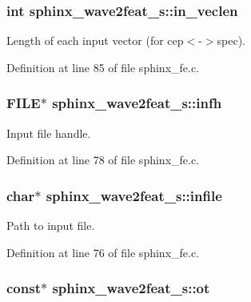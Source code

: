 \subsubsection[{in\+\_\+veclen}]{\setlength{\rightskip}{0pt plus 5cm}int sphinx\+\_\+wave2feat\+\_\+s\+::in\+\_\+veclen}\label{structsphinx__wave2feat__s_a3410a9e0c05c0057f31452550fb5380a}


Length of each input vector (for cep$<$-\/$>$spec). 



Definition at line 85 of file sphinx\+\_\+fe.\+c.

\subsubsection[{infh}]{\setlength{\rightskip}{0pt plus 5cm}F\+I\+L\+E$\ast$ sphinx\+\_\+wave2feat\+\_\+s\+::infh}\label{structsphinx__wave2feat__s_ad86834e597d4677aed93e7c06cebccb7}


Input file handle. 



Definition at line 78 of file sphinx\+\_\+fe.\+c.

\subsubsection[{infile}]{\setlength{\rightskip}{0pt plus 5cm}char$\ast$ sphinx\+\_\+wave2feat\+\_\+s\+::infile}\label{structsphinx__wave2feat__s_a6d4d1b1be4e3a3c1de82943e9e6fa65c}


Path to input file. 



Definition at line 76 of file sphinx\+\_\+fe.\+c.

\subsubsection[{ot}]{ const$\ast$ sphinx\+\_\+wave2feat\+\_\+s\+::ot}\label{structsphinx__wave2feat__s_a929e05e041ad922f6a2e35637a98c917}


